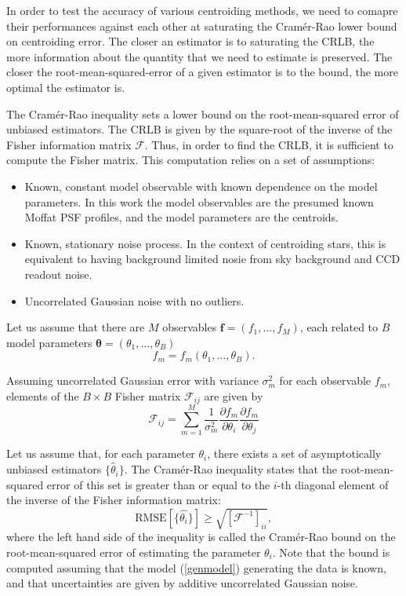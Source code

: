 \documentclass[12pt, preprint]{aastex}
\newcommand{\beq}{\begin{equation}}
\newcommand{\eeq}{\end{equation}}
\begin{document}
In order to test the accuracy of various centroiding methods, we need to comapre their 
performances against each other at saturating the Cram\'{e}r-Rao lower bound on centroiding error. 
The closer an estimator is to saturating the CRLB, the more information about the quantity that we 
need to estimate is preserved. The closer the root-mean-squared-error of a given estimator is to the bound, 
the more optimal the estimator is. 

The Cram\'{e}r-Rao inequality \citep{cramer} sets a lower bound on the 
root-mean-squared error of unbiased estimators. The CRLB is given by the square-root of the inverse of 
the Fisher information matrix $\mathcal{F}$. Thus, in order to find the CRLB,
 it is sufficient to compute the Fisher matrix. This computation relies on a set of assumptions:

\begin{itemize}
  \item Known, constant model observable with known dependence on the model parameters. 
        In this work the model observables are the presumed known Moffat PSF profiles, 
        and the model parameters are the centroids. 
  \item Known, stationary noise process. In the context of centroiding stars, this is equivalent to 
        having background limited nosie from sky background and CCD readout noise.
  \item Uncorrelated Gaussian noise with no outliers. 
\end{itemize}
 

Let us assume that there are $M$ observables $\mathbf{f} = (f_{1}, ... , f_{M})$, each
related to $B$ model parameters $\boldsymbol{\mathbf{\theta}} = (\theta_{1} , ... , \theta_{B})$ 
\beq
f_{m} = f_{m}(\theta_{1} , ... , \theta_{B}).
\label{genmodel}
\eeq

Assuming uncorrelated Gaussian error with variance $\sigma^{2}_{m}$ for each observable $f_{m}$, elements
of the $B\times B$ Fisher matrix $\mathcal{F}_{ij}$ are given by
\beq
\mathcal{F}_{ij} = \sum_{m=1}^{M}\frac{1}{\sigma_{m}^{2}}\frac{\partial f_{m}}{\partial \theta_{i}}\frac{\partial f_{m}}{\partial \theta_{j}}
\label{fisher}
\eeq

Let us assume that, for each parameter $\theta_{i}$, there exists a set of 
asymptotically unbiased estimators $\{\hat{\theta}_{i}\}$. The Cram\'{e}r-Rao inequality 
states that the root-mean-squared error of this set is greater than or equal to 
the $i$-th diagonal element of the inverse of the Fisher information matrix:
\beq
\text{RMSE}[\{\hat{\theta_{i}}\}] \geq \sqrt{[\mathcal{F}^{-1}]_{ii}},
\label{inequality}
\eeq
where the left hand side of the inequality is called the Cram\'{e}r-Rao bound on 
the root-mean-squared error of estimating the parameter $\theta_{i}$. Note that 
the bound is computed assuming that the model (\ref{genmodel}) generating the data 
is known, and that uncertainties are given by additive uncorrelated Gaussian noise.
\end{document}
